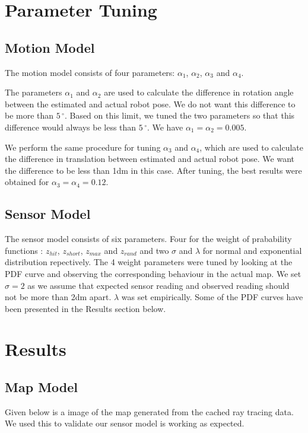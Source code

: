 \documentclass{article}
\begin{document}
\section{Parameter Tuning}
\subsection{Motion Model}
The motion model consists of four parameters: $\alpha_{1}$, $\alpha_{2}$, $\alpha_{3}$ and $\alpha_{4}$.

The parameters $\alpha_{1}$ and $\alpha_{2}$ are used to calculate the difference in rotation angle between the estimated and actual robot pose. We do not want this difference to be more than $5\,^{\circ}$. Based on this limit, we tuned the two parameters so that this difference would always be less than $5\,^{\circ}$. We have $\alpha_{1} = \alpha_{2} = 0.005$.

We perform the same procedure for tuning $\alpha_{3}$ and $\alpha_{4}$, which are used to calculate the difference in translation between estimated and actual robot pose. We want the difference to be less than 1dm in this case. After tuning, the best results were obtained for $\alpha_{3} = \alpha_{4} = 0.12$.

\subsection{Sensor Model}
The sensor model consists of six parameters. Four for the weight of prabability functions : $z_{hit}$, $z_{short}$, $z_{max}$ and $z_{rand}$ and two $\sigma$ and $\lambda$ for normal and exponential distribution repectively. The 4 weight parameters were tuned by looking at the PDF curve and observing the corresponding behaviour in the actual map. We set $\sigma = 2$ as we assume that expected sensor reading and observed reading should not be more than 2dm apart. $\lambda$ was set empirically. Some of the PDF curves have been presented in the Results section below.

\pagebreak

\section{Results}

\subsection{Map Model}
Given below is a image of the map generated from the cached ray tracing data. We used this to validate our sensor model
is working as expected.
\end{document}
